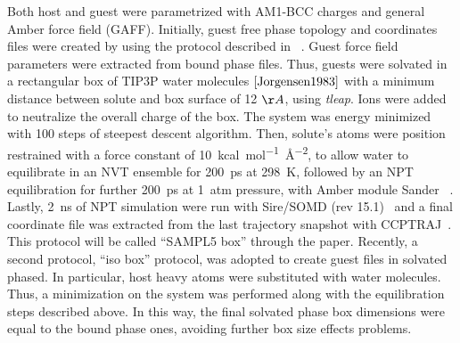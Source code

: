 \documentclass[11pt,oneside,a4paper]{article}
\begin{document}
Both host and guest were parametrized with AM1-BCC charges and general Amber force field (GAFF).
Initially, guest free phase topology and coordinates files were created by using the protocol described in ~\cite{bosisio2016blinded}. Guest force field parameters were extracted from bound phase files.  Thus, guests were solvated in a rectangular box of TIP3P water molecules $\cite{Jorgensen1983}$ with a minimum distance between solute and box surface of 12 $\AA$, using \textit{tleap}. Ions were added to neutralize the overall charge of the box. The system was energy minimized with 100 steps of steepest descent algorithm. Then, solute's atoms were position restrained with a force constant of \SI{10}{kcal mol^{-1}\AA^{-2}}, to allow water to equilibrate in an NVT ensemble for \SI{200}{ps} at \SI{298}{K}, followed by an NPT equilibration for further \SI{200}{ps} at \SI{1}{atm} pressure, with Amber module Sander ~\cite{AMBER}. Lastly, \SI{2}{ns} of NPT simulation were run with Sire/SOMD (rev 15.1)~\cite{Sire,OpenMM} and a final coordinate file was extracted from the last trajectory snapshot with CCPTRAJ~\cite{CPPTRAJ}. This protocol will be called ``SAMPL5 box'' through the paper.
Recently, a second protocol, ``iso box'' protocol, was adopted to create guest files in solvated phased. In particular, host heavy atoms were substituted with water molecules. Thus, a minimization on the system was performed along with the equilibration steps described above. In this way, the final solvated phase box dimensions were equal to the bound phase ones, avoiding further box size effects problems. 
\end{document}
